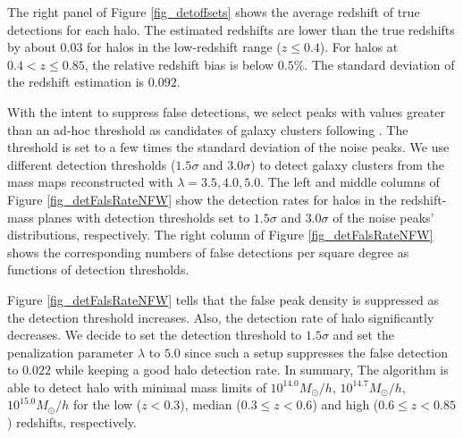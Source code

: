The right panel of Figure \ref{fig_detoffsets} shows the average redshift of
true detections for each halo. The estimated redshifts are lower than the true
redshifts by about $0.03$ for halos in the low-redshift range ($z\leq 0.4$).
For halos at $0.4<z\leq 0.85$, the relative redshift bias is below $0.5\%$. The
standard deviation of the redshift estimation is $0.092$.

With the intent to suppress false detections, we select peaks with values
greater than an ad-hoc threshold as candidates of galaxy clusters following
\citet{WL-massMap-clusDet-HSC-Miyazaki2018}.  The threshold is set to a few
times the standard deviation of the noise peaks. We use different detection
thresholds ($1.5\sigma$ and $3.0\sigma$) to detect galaxy clusters from the
mass maps reconstructed with $\lambda=3.5,4.0,5.0$. The left and middle columns
of Figure \ref{fig_detFalsRateNFW} show the detection rates for halos in the
redshift-mass planes with detection thresholds set to $1.5\sigma$ and
$3.0\sigma$ of the noise peaks' distributions, respectively.  The right column
of Figure \ref{fig_detFalsRateNFW} shows the corresponding numbers of false
detections per square degree as functions of detection thresholds.

Figure \ref{fig_detFalsRateNFW} tells that the false peak density is suppressed
as the detection threshold increases. Also, the detection rate of halo
significantly decreases. We decide to set the detection threshold to
$1.5\sigma$ and set the penalization parameter $\lambda$ to $5.0$ since such a
setup suppresses the false detection to $0.022$ while keeping a good halo
detection rate.
In summary, The algorithm is able to detect halo with minimal mass limits of
$10^{14.0} M_{\odot}/h$, $10^{14.7} M_{\odot}/h$, $10^{15.0} M_{\odot}/h$ for
the low ($z<0.3$), median ($0.3\leq z< 0.6$) and high ($0.6\leq z< 0.85$)
redshifts, respectively.

